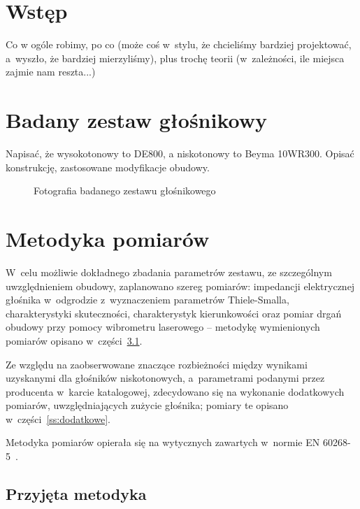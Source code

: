 \documentclass[12pt]{oska}
\affiliation{Akademia Górniczo-Hutnicza im. S. Staszica w Krakowie}
\begin{document}
\maketitles

\section{Wstęp}

	\color{orange} Co w ogóle robimy, po co (może coś w~stylu, że chcieliśmy bardziej projektować, a~wyszło, że bardziej mierzyliśmy), plus trochę teorii (w~zależności, ile miejsca zajmie nam reszta...)
	\color{black}

\section{Badany zestaw głośnikowy}

	\color{orange} Napisać, że wysokotonowy to DE800, a niskotonowy to Beyma 10WR300. Opisać konstrukcję, zastosowane modyfikacje obudowy.
	\color{black}

	\begin{figure}[h!]
		\centering
		\caption{Fotografia badanego zestawu głośnikowego}
		\label{r:zdjecie}
	\end{figure}


\section{Metodyka pomiarów}

	W~celu możliwie dokładnego zbadania parametrów zestawu, ze szczególnym uwzględnieniem obudowy, zaplanowano szereg pomiarów: impedancji elektrycznej głośnika w~odgrodzie z~wyznaczeniem parametrów Thiele-Smalla, charakterystyki skuteczności, charakterystyk kierunkowości oraz pomiar drgań obudowy przy pomocy wibrometru laserowego -- metodykę wymienionych pomiarów opisano w~części~\ref{ss:metodyka}.
	
	Ze względu na zaobserwowane znaczące rozbieżności między wynikami uzyskanymi dla głośników niskotonowych, a~parametrami podanymi przez producenta w~karcie katalogowej, zdecydowano się na wykonanie dodatkowych pomiarów, uwzględniających zużycie głośnika; pomiary te opisano w~części~\ref{ss:dodatkowe}.
	
	Metodyka pomiarów opierała się na wytycznych zawartych w~normie EN 60268-5~\cite{norma}.

	\subsection{Przyjęta metodyka}\label{ss:metodyka}
	
\end{document}

